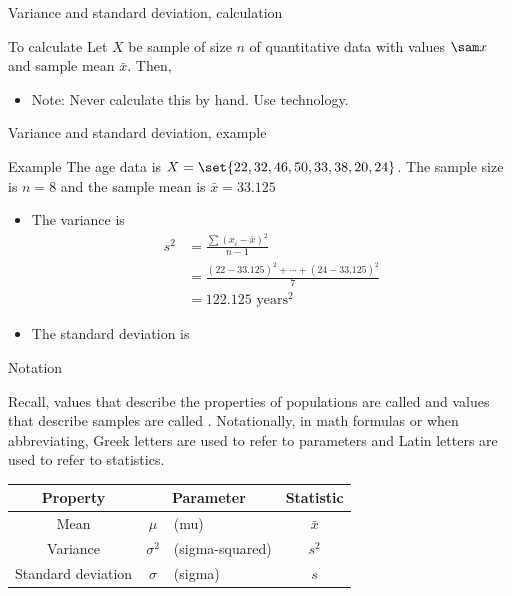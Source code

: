 \documentclass[xcolor=table, aspectratio=169, bigger]{beamer}
\begin{document}
\begin{frame}{Variance and standard deviation, calculation}
\begin{block}{To calculate}
Let $X$ be sample of size $n$ of quantitative data with values $\sam x$ and sample mean $\bar x$. Then,\\
\smallskip
{}
\begin{itemize}
\pause\item Note: Never calculate this by hand. Use technology.
\end{itemize}
\end{block}
\end{frame}

\begin{frame}{Variance and standard deviation, example}
\begin{exampleblock}{Example}
The age data is $X = \set{22, 32, 46, 50, 33, 38, 20, 24}$. The sample size is $n=8$ and the sample mean is $\bar x = 33.125$
\begin{itemize}
\pause
\item The variance is \vspace{-.1in}
\begin{align*}
s^2 &= \frac{\sum (x_i - \bar x)^2}{n-1}\\
&= \frac{(22-33.125)^2 + \cdots + (24-33.125)^2}{7}\\
&= 122.125 \text{ years}^\text{2}
\end{align*} \vspace{-.2in}
\pause\item The standard deviation is\\ \smallskip
{}
\end{itemize}
\smallskip
\end{exampleblock}
\end{frame}


\begin{frame}{Notation}
\begin{block}{}
Recall, values that describe the properties of populations are called  and values that describe samples are called . Notationally, in math formulas or when abbreviating, Greek letters are used to refer to parameters and Latin letters are used to refer to statistics.
\pause
\begin{center}
\begin{tabular}{c |c l | c}
Property & \multicolumn{2}{c|}{Parameter} & Statistic\\
\hline
Mean & $\mu$ & (mu) & $\bar x$\\
Variance & $\sigma^2$ &(sigma-squared) & $s^2$\\
Standard deviation & $\sigma$ &(sigma) & $s$
\end{tabular}
\end{center} 
\end{block}
\end{frame}
\end{document}
